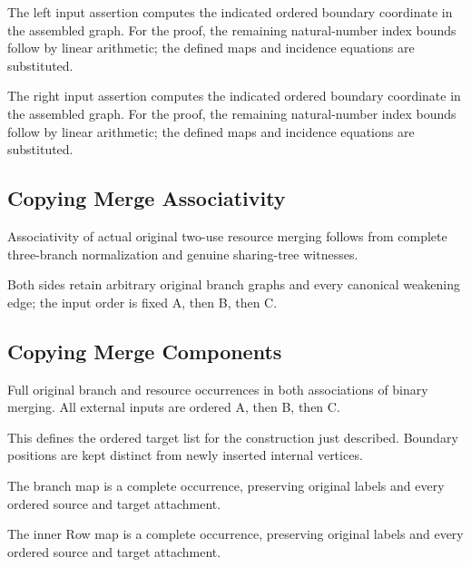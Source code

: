 The left input assertion computes the indicated ordered boundary coordinate in the assembled graph.
For the proof, the remaining natural-number index bounds follow by linear arithmetic; the defined maps and incidence equations are substituted.
\par{}

The right input assertion computes the indicated ordered boundary coordinate in the assembled graph.
For the proof, the remaining natural-number index bounds follow by linear arithmetic; the defined maps and incidence equations are substituted.
\par{}

\subsection{Copying Merge Associativity}
Associativity of actual original two-use resource merging follows from complete three-branch normalization and genuine sharing-tree witnesses.

Both sides retain arbitrary original branch graphs and every canonical weakening edge; the input order is fixed A, then B, then C.
\par{}

\subsection{Copying Merge Components}
Full original branch and resource occurrences in both associations of binary merging. All external inputs are ordered A, then B, then C.

This defines the ordered target list for the construction just described. Boundary positions are kept distinct from newly inserted internal vertices.
\par{}

The branch map is a complete occurrence, preserving original labels and every ordered source and target attachment.
\par{}

The inner Row map is a complete occurrence, preserving original labels and every ordered source and target attachment.
\par{}

